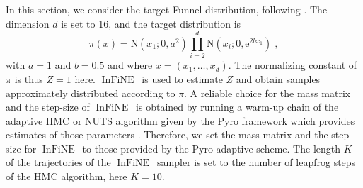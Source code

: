 \documentclass{article}
\def\Normal{\mathrm{N}}
\def\IFIS{\ensuremath{\operatorname{InFiNE}}}
\def\InFiNE{{\small \IFIS}}
\def\eqsp{\,}
\def\eqsp{\;}
\newcommand{\1}{\mathds{1}}
\def\target{\pi}
\def\rme{\mathrm{e}}
\begin{document}
In this section, we consider the target Funnel distribution, following \cite{jia2020normalizing}.
The dimension $d$ is set to 16, and the target distribution is
\[
\pi(x) = \Normal(x_1; 0, a^2)\prod_{i=2}^d \Normal(x_i; 0,\rme^{2bx_1})\eqsp,
\]
with $a= 1$ and $b=0.5$ and  where $x=(x_1,\dots, x_d)$. 
 The normalizing constant of $\pi$ is thus $Z=1$ here. \IFIS\ is used to estimate $Z$ and obtain samples approximately distributed according to $\target$. %
A reliable choice for the mass matrix and the step-size of \InFiNE\ is obtained by running a warm-up chain of the adaptive HMC or NUTS algorithm given by the Pyro framework which provides estimates of those parameters \cite{bingham2019pyro}. %
 Therefore, we set the mass matrix and the step size for \InFiNE\ to those provided by the Pyro adaptive scheme.
The length $K$ of the trajectories of the \IFIS\ sampler is set to the number of leapfrog steps of the HMC algorithm, here $K=10$.
\end{document}
